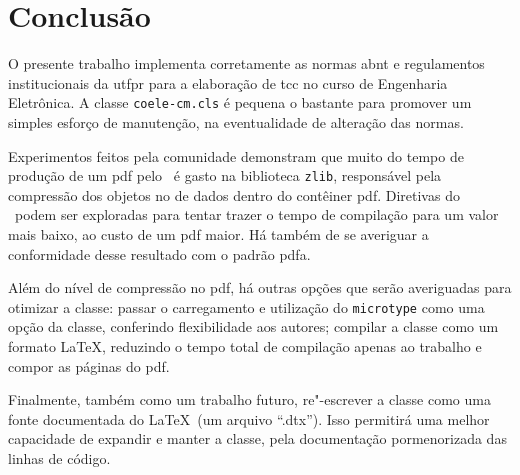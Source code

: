 \chapter{Conclusão}

O presente trabalho implementa corretamente as normas \ac{abnt} e regulamentos institucionais da \ac{utfpr} para a elaboração de \ac{tcc} no curso de Engenharia Eletrônica. A classe \texttt{coele-cm.cls} é pequena o bastante para promover um simples esforço de manutenção, na eventualidade de alteração das normas.

Experimentos feitos pela comunidade demonstram que muito do tempo de produção de um \ac{pdf} pelo \pdftex\ é gasto na biblioteca \texttt{zlib}, responsável pela compressão dos objetos no  de dados dentro do contêiner \ac{pdf}. Diretivas do \pdftex\ podem ser exploradas para tentar trazer o tempo de compilação para um valor mais baixo, ao custo de um \ac{pdf} maior. Há também de se averiguar a conformidade desse resultado com o padrão \ac{pdfa}.

Além do nível de compressão no \ac{pdf}, há outras opções que serão averiguadas para otimizar a classe: passar o carregamento e utilização do \texttt{microtype} como uma opção da classe, conferindo flexibilidade aos autores; compilar a classe como um formato \LaTeX, reduzindo o tempo total de compilação apenas ao trabalho e compor as páginas do \ac{pdf}.

Finalmente, também como um trabalho futuro, re"-escrever a classe como uma fonte documentada do \LaTeX\ (um arquivo \enquote{.dtx}). Isso permitirá uma melhor capacidade de expandir e manter a classe, pela documentação pormenorizada das linhas de código.
